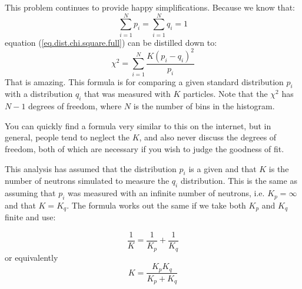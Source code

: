 \documentclass[letterpaper,12pt]{article}
\begin{document}
This problem continues to provide happy simplifications. Because we know that:
\begin{equation}
\sum_{i=1}^{N}p_i=\sum_{i=1}^{N}q_i=1
\end{equation}
equation (\ref{eq.dist.chi.square.full}) can be distilled down to:
\begin{equation}
\chi^2=\sum_{i=1}^N\frac{K(p_i - q_i)^2}{p_i}
\end{equation}
That is amazing. This formula is for comparing a given standard distribution $p_i$ with a distribution $q_i$ that was measured with $K$ particles. Note that the $\chi^2$ has $N-1$ degrees of freedom, where $N$ is the number of bins in the histogram.

You can quickly find a formula very similar to this on the internet, but in general, people tend to neglect the $K$, and also never discuss the degrees of freedom, both of which are necessary if you wish to judge the goodness of fit.

This analysis has assumed that the distribution $p_i$ is a given and that $K$ is the number of neutrons simulated to measure the $q_i$ distribution. This is the same as assuming that $p_i$ was measured with an infinite number of neutrons, i.e. $K_p=\infty$ and that $K=K_q$. The formula works out the same if we take both $K_p$ and $K_q$ finite and use:

\begin{equation}
	\frac{1}{K}=\frac{1}{K_p}+\frac{1}{K_q}
\end{equation}
or equivalently
\begin{equation}
	K=\frac{K_pK_q}{K_p+K_q}
\end{equation}
\end{document}
